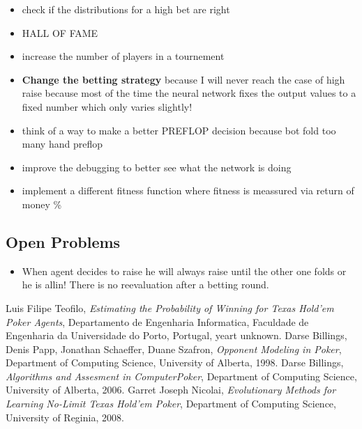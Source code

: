 \begin{itemize}
\item check if the distributions for a high bet are right
\item HALL OF FAME
\item increase the number of players in a tournement
\item \textbf{Change the betting strategy} because I will never reach the case of high raise because most of the time the neural network fixes the output values to a fixed number which only varies slightly!
\item think of a way to make a better PREFLOP decision because bot fold too many hand preflop
\item improve the debugging to better see what the network is doing
\item implement a different fitness function where fitness is meassured via return of money \%
\end{itemize}

\subsection{Open Problems}
\begin{itemize}
\item When agent decides to raise he will always raise until the other one folds or he is allin! There is no reevaluation after a betting round.
\end{itemize}


\begin{thebibliography}{9}
  Luis Filipe Teofilo,
  \textit{Estimating the Probability of Winning for Texas Hold'em Poker Agents},
  Departamento de Engenharia Informatica, Faculdade de Engenharia da Universidade do Porto,
  Portugal,
  yeart unknown.
  Darse Billings, Denis Papp, Jonathan Schaeffer, Duane Szafron,
  \textit{Opponent Modeling in Poker},
  Department of Computing Science, University of Alberta, 
 1998.
  Darse Billings,
  \textit{Algorithms and Assesment in ComputerPoker},
  Department of Computing Science, University of Alberta, 
 2006.
  Garret Joseph Nicolai,
  \textit{Evolutionary Methods for Learning No-Limit Texas Hold'em Poker},
  Department of Computing Science, University of Reginia, 
 2008.
\end{thebibliography}

\FloatBarrier\label{end-of-document}


